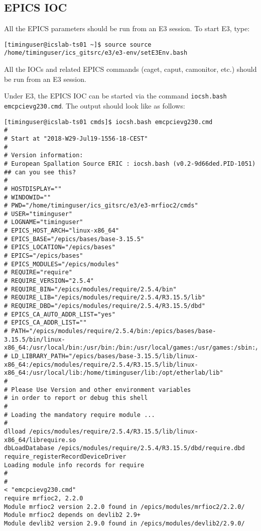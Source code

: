 \documentclass[11pt
  , a4paper
  , article
  , oneside
  , showtrims
]{memoir}
\begin{document}
\subsection{EPICS IOC}
All the EPICS parameters should be run from an E3 session. To start E3, type:
\begin{lstlisting}[style=termstyle]
[timinguser@icslab-ts01 ~]$ source source /home/timinguser/ics_gitsrc/e3/e3-env/setE3Env.bash
\end{lstlisting}
All the IOCs and related EPICS commands (caget, caput, camonitor, etc.) should be run from an E3 session.

Under E3, the EPICS IOC can be started via the command \texttt{iocsh.bash emcpcievg230.cmd}. The output should look like as follows:

\begin{lstlisting}[style=termstyle]
[timinguser@icslab-ts01 cmds]$ iocsh.bash emcpcievg230.cmd
#
# Start at "2018-W29-Jul19-1556-18-CEST"
#
# Version information:
# European Spallation Source ERIC : iocsh.bash (v0.2-9d66ded.PID-1051)
## can you see this?
#
# HOSTDISPLAY=""
# WINDOWID=""
# PWD="/home/timinguser/ics_gitsrc/e3/e3-mrfioc2/cmds"
# USER="timinguser"
# LOGNAME="timinguser"
# EPICS_HOST_ARCH="linux-x86_64"
# EPICS_BASE="/epics/bases/base-3.15.5"
# EPICS_LOCATION="/epics/bases"
# EPICS="/epics/bases"
# EPICS_MODULES="/epics/modules"
# REQUIRE="require"
# REQUIRE_VERSION="2.5.4"
# REQUIRE_BIN="/epics/modules/require/2.5.4/bin"
# REQUIRE_LIB="/epics/modules/require/2.5.4/R3.15.5/lib"
# REQUIRE_DBD="/epics/modules/require/2.5.4/R3.15.5/dbd"
# EPICS_CA_AUTO_ADDR_LIST="yes"
# EPICS_CA_ADDR_LIST=""
# PATH="/epics/modules/require/2.5.4/bin:/epics/bases/base-3.15.5/bin/linux-x86_64:/usr/local/bin:/usr/bin:/bin:/usr/local/games:/usr/games:/sbin:/home/timinguser/bin:/opt/etherlab/bin:/opt/etherlab/sbin"
# LD_LIBRARY_PATH="/epics/bases/base-3.15.5/lib/linux-x86_64:/epics/modules/require/2.5.4/R3.15.5/lib/linux-x86_64:/usr/local/lib:/home/timinguser/lib:/opt/etherlab/lib"
#
# Please Use Version and other environment variables
# in order to report or debug this shell
#
# Loading the mandatory require module ...
#
dlload /epics/modules/require/2.5.4/R3.15.5/lib/linux-x86_64/librequire.so
dbLoadDatabase /epics/modules/require/2.5.4/R3.15.5/dbd/require.dbd
require_registerRecordDeviceDriver
Loading module info records for require
#
#
< "emcpcievg230.cmd"
require mrfioc2, 2.2.0
Module mrfioc2 version 2.2.0 found in /epics/modules/mrfioc2/2.2.0/
Module mrfioc2 depends on devlib2 2.9+
Module devlib2 version 2.9.0 found in /epics/modules/devlib2/2.9.0/

\end{lstlisting}
\end{document}

